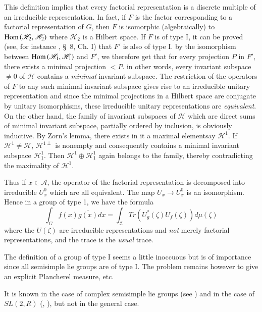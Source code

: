  This definition implies that every factorial representation is a
 discrete multiple of an irreducible representation. In fact, if $F$
 is the factor corresponding to a factorial representation of $G$,
 then $F$ is isomorphic (algebraically) to
 $\operatorname{Hom}{(\mathscr{H}_2,\mathscr{H}_2)}$ where $\mathscr{H}_2$ is a
 Hilbert  space.  If $F$ is of type I, it can be proved (see, for instance
 \cite{key1}, \S\ 8, Ch. I) that  $F'$ is also of type I. by the
 isomorphism between $\operatorname{Hom} {(\mathscr{H}_1,\mathscr{H}_1)}$ and $F'$,
 we therefore get that for every projection $P$ in $F'$, there exists
 a minimal projection $<P$. in other words, every invariant subspace
 $\neq 0$ of ${\mathscr{H}}$ contains a \textit{minimal} invariant
 subspace. The restriction of the operators of $F$ to any such minimal
 invariant subspace gives rise to an irreducible unitary
 representation and since the minimal projections in a Hilbert space are
 conjugate by unitary isomorphisms, these irreducible unitary
 representations are \textit{equivalent}. On the other hand, the
 family of invariant subspaces of $\mathscr{H}$ which are direct sums
 of minimal invariant subspace, partially ordered by inclusion, is
 obviously inductive. By Zorn's lemma, there exists in it a maximal
 element\pageoriginale say $\mathscr{H}^1$. If $\mathscr{H}^1\neq
 \mathscr{H}$, $\mathscr{H}^{1\perp}$ is nonempty and consequently
 contains a minimal invariant subspace $\mathscr{H}^1_1$. Then
 $\mathscr{H}^1\oplus\mathscr{H}^1_1$ again belongs  to the family,
 thereby contradicting the maximality of $\mathscr{H}^1$. 
 
Thus if $x \in \mathcal{A}$, the operator of the factorial representation is
decomposed into irreducible $U^0_x$ which are all equivalent. The map
$U_x \rightarrow U^0_x$ is an isomorphism. Hence in a group of type
1, we have the formula 
$$  
\int_G f(x)\overline{g(x)}dx=\int_ {\mathcal{Z}}
Tr(U_g^*(\zeta)U_f(\zeta))d\mu(\zeta)  
$$
where the $U (\zeta)$ are irreducible representations and \textit{not}
merely factorial representations, and the trace is the \textit{usual}
trace. 
 
The definition of a group of type I seems a little inoccuous but is
of importance since all semisimple lie groups are of type I. The
problem remains however to give an explicit Plancherel measure, etc. 

It is known in the case of complex semisimple lie groups (see \cite{key26})
and in the case of $SL(2,R)$ (\cite{key2}, \cite{key25}), but not in
the general case.  

